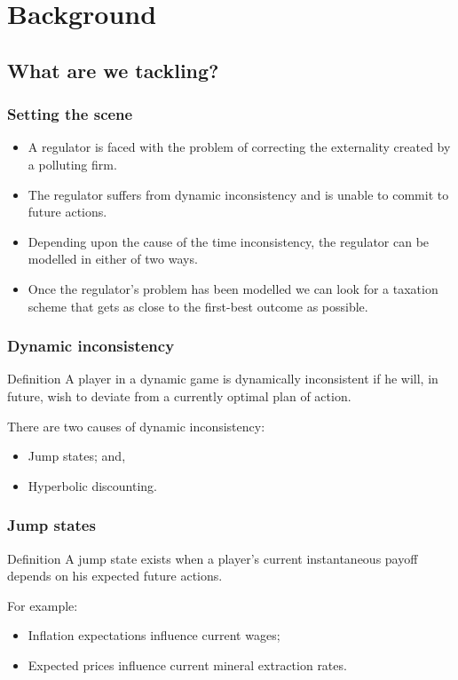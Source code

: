 \documentclass{beamer}
\begin{document}
\section{Background}

\subsection{What are we tackling?}

\begin{frame}
  \frametitle{Setting the scene}
  \begin{itemize}
  \item<1-> A regulator is faced with the problem of correcting the
    externality created by a polluting firm.
  \item<2-> The regulator suffers from dynamic inconsistency and is
    unable to commit to future actions.
  \item<3-> Depending upon the cause of the time inconsistency, the
    regulator can be modelled in either of two ways.
  \item<4-> Once the regulator's problem has been modelled we can look
    for a taxation scheme that gets as close to the first-best outcome
    as possible.
  \end{itemize}
\end{frame}

\begin{frame}
  \frametitle{Dynamic inconsistency}
  \begin{block}{Definition}
    A player in a dynamic game is dynamically inconsistent if he
    will, in future, wish to deviate from a currently optimal plan of
    action.
  \end{block}\pause
  There are two causes of dynamic inconsistency:
  \begin{itemize}
  \item Jump states; and,
  \item Hyperbolic discounting.
  \end{itemize}
\end{frame}

\begin{frame}
  \frametitle{Jump states}
  \begin{block}{Definition}
    A jump state exists when a player's current instantaneous payoff
    depends on his expected future actions.
  \end{block}
  For example:
  \begin{itemize}
  \item<1-> Inflation expectations influence current wages;
  \item<2-> Expected prices influence current mineral extraction rates.
  \end{itemize}
\end{frame}
\end{document}
